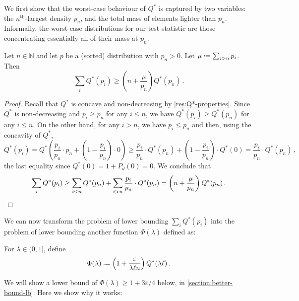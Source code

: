 \documentclass{theoretics}
\newcommand*{\define}{\mathrel{\vcenter{\baselineskip0.5ex \lineskiplimit0pt
                      \hbox{\scriptsize.}\hbox{\scriptsize.}}}%
                      =}
\newcommand{\bN}{\ensuremath{\mathbb{N}}}
\renewcommand{\epsilon}{\varepsilon}
\begin{document}
We first show that the worst-case behaviour of $Q^*$ is captured by two variables: the
$n^\text{th}$-largest density $p_n$, and the total mass of elements lighter than $p_n$. Informally,
the worst-case distributions for our test statistic are those concentrating essentially all of their
mass at $p_n$.

\begin{proposition}
    \label{res:Q*-worst-case}
    Let $n \in \bN$ and let $p$ be a (sorted) distribution with $p_n > 0$. Let $\mu \define \sum_{i
    > n} p_i$. Then
    \[
        \sum_i Q^*(p_i) \ge \left(n + \frac{\mu}{p_n}\right) Q^*(p_n) \,.
    \]
\end{proposition}
\begin{proof}
    Recall that $Q^*$ is concave and non-decreasing by \cref{res:Q*-properties}. Since $Q^*$ is
    non-decreasing and $p_i \ge p_n$ for any $i \le n$, we have $Q^*(p_i) \ge Q^*(p_n)$ for any $i
    \le n$. On the other hand, for any $i > n$, we have $p_i \le p_n$ and then, using the concavity
    of $Q^*$,
    \[
        Q^*(p_i)
        = Q^*\left( \frac{p_i}{p_n} \cdot p_n + \left(1-\frac{p_i}{p_n}\right) \cdot 0 \right)
        \ge \frac{p_i}{p_n} \cdot Q^*(p_n) + \left(1-\frac{p_i}{p_n}\right) \cdot Q^*(0)
        = \frac{p_i}{p_n} \cdot Q^*(p_n) \,,
    \]
    the last equality since $Q^*(0) = 1 + P_d(0) = 0$. We conclude that
    \[
        \sum_i Q^*(p_i)
        \ge \sum_{i \le n} Q^*(p_n) + \sum_{i > n} \frac{p_i}{p_n} \cdot Q^*(p_n)
        = \left(n + \frac{\mu}{p_n}\right) Q^*(p_n) \,. \qedhere
    \]
\end{proof}

We can now transform the problem of lower bounding $\sum_i Q^*(p_i)$ into the problem of lower
bounding another function $\Phi(\lambda)$ defined as:

\begin{definition}
For $\lambda \in (0,1]$, define
\[
  \Phi(\lambda) \define \left(1 + \frac{\epsilon}{\lambda \ell n}\right) Q^*(\lambda \ell) \,.
\]
\end{definition}

We will show a lower bound of $\Phi(\lambda) \geq 1+3\epsilon/4$ below, in
\cref{section:better-bound-lb}. Here we show why it works:
\end{document}
